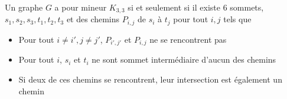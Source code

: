 \documentclass{scrartcl}
\begin{document}
\begin{flushleft}
\begin{lem}\label{CNSK33}
    Un graphe $G$ a pour mineur $K_{3,3}$ si et seulement si il existe $6$ sommets, $s_1, s_2, s_3, t_1, t_2, t_3$ et des chemins
    $P_{i,j}$ de $s_i$ à $t_j$ pour tout $i, j$ tels que
    \begin{itemize}
        \item Pour tout $i \neq i', j \neq j'$, $P_{i',j'}$ et $P_{i, j}$ ne se rencontrent pas
        \item Pour tout $i$, $s_i$ et $t_i$ ne sont sommet intermédiaire d'aucun des chemins
        \item Si deux de ces chemins se rencontrent, leur intersection est également un chemin
    \end{itemize}
\end{lem}


\end{flushleft}
\end{document}

